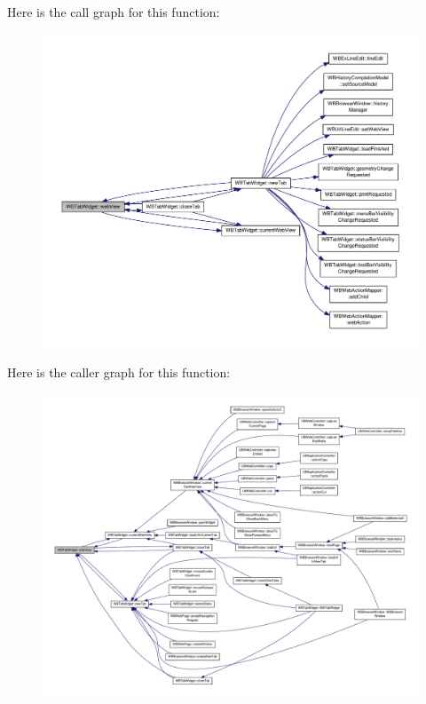 Here is the call graph for this function\-:
\nopagebreak
\begin{figure}[H]
\begin{center}
\leavevmode
\includegraphics[width=350pt]{de/dc7/class_w_b_tab_widget_a99290e7824dd979d8bf98a5dc476e6e0_cgraph}
\end{center}
\end{figure}




Here is the caller graph for this function\-:
\nopagebreak
\begin{figure}[H]
\begin{center}
\leavevmode
\includegraphics[width=350pt]{de/dc7/class_w_b_tab_widget_a99290e7824dd979d8bf98a5dc476e6e0_icgraph}
\end{center}
\end{figure}


